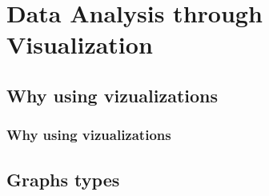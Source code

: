 



\begin{frame}
   \titlepage
\end{frame}



\begin{frame}
   \tableofcontents
\end{frame}

\section{Data Analysis through Visualization}


\subsection{Why using vizualizations}

\begin{frame}\frametitle{Why using vizualizations}

\end{frame}

\subsection{Graphs types}

